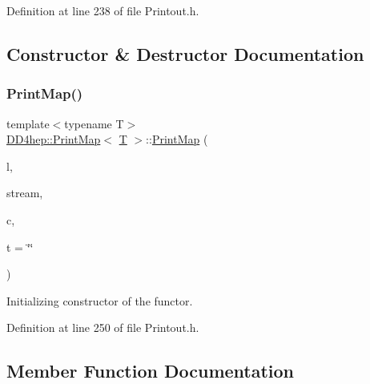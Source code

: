 Definition at line 238 of file Printout.\+h.



\subsection{Constructor \& Destructor Documentation}
\hypertarget{struct_d_d4hep_1_1_print_map_a5e9d6107e83c34022dd352fc04cf346a}{}\label{struct_d_d4hep_1_1_print_map_a5e9d6107e83c34022dd352fc04cf346a} 
\subsubsection{\texorpdfstring{Print\+Map()}{PrintMap()}}
{\footnotesize\ttfamily template$<$typename T$>$ \\
\hyperlink{struct_d_d4hep_1_1_print_map}{D\+D4hep\+::\+Print\+Map}$<$ \hyperlink{class_t}{T} $>$\+::\hyperlink{struct_d_d4hep_1_1_print_map}{Print\+Map} (\begin{DoxyParamCaption}\item[{const \hyperlink{class_d_d4hep_1_1_geometry_1_1_l_c_d_d}{Geometry\+::\+L\+C\+DD} $\ast$}]{l,  }\item[{std\+::ostream \&}]{stream,  }\item[{\hyperlink{struct_d_d4hep_1_1_print_map_a75356a94ee86763170e76a2096ec4cb5}{cont\+\_\+type} \&}]{c,  }\item[{const std\+::string \&}]{t = {\ttfamily \char`\"{}\char`\"{}} }\end{DoxyParamCaption})\hspace{0.3cm}{\ttfamily [inline]}}



Initializing constructor of the functor. 



Definition at line 250 of file Printout.\+h.



\subsection{Member Function Documentation}
\hypertarget{struct_d_d4hep_1_1_print_map_a9a0ce25cdb005c64f747c52f249ab884}{}\label{struct_d_d4hep_1_1_print_map_a9a0ce25cdb005c64f747c52f249ab884} 
